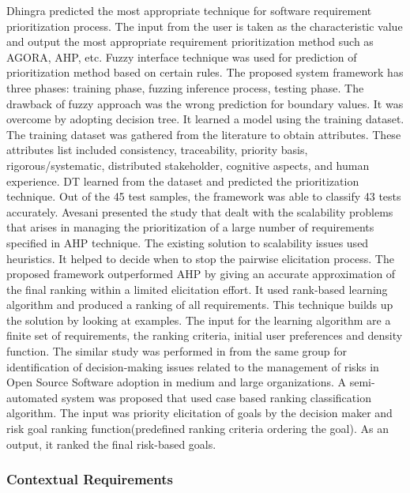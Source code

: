 Dhingra \etal  \cite{S.Dhingra} predicted the most appropriate technique for
software requirement prioritization process. The input from the user is taken as
the characteristic value and output the
most appropriate requirement prioritization method such as AGORA, AHP, etc. Fuzzy interface technique was
used for prediction of prioritization method based on certain rules. The
proposed system framework has three phases: training phase, fuzzing inference
process, testing phase. The drawback of fuzzy approach was the wrong prediction
for boundary values. It was overcome by adopting decision tree. It learned a
model using the training dataset. The training dataset was gathered from the
literature to obtain attributes. These attributes list included consistency,
traceability, priority basis, rigorous/systematic, distributed stakeholder,
cognitive aspects, and human experience.  DT learned from the dataset and
predicted the prioritization technique. Out of the 45 test samples, the
framework was able to classify 43 tests accurately. Avesani \etal
\cite{PAvesani} presented the study that dealt with the scalability problems
that arises in managing the prioritization of a large number of requirements
specified in AHP technique.  The existing solution to scalability issues used
heuristics. It helped to decide when to stop the pairwise elicitation process.
The proposed framework outperformed AHP by giving an accurate approximation of
the final ranking within a limited elicitation effort. It used rank-based
learning algorithm and produced a ranking of all requirements. This technique
builds up the solution by looking at examples. The input for the learning
algorithm are a finite set of requirements, the ranking criteria, initial user
preferences and density function.
The similar study was performed in \cite{7320432}from the same group
\cite{PAvesani} for identification of decision-making issues related to the
management of risks in Open Source Software adoption in medium and large
organizations. A  semi-automated system was proposed that used case based
ranking classification algorithm. The input was priority elicitation of goals by
the decision maker and risk goal ranking function(predefined ranking criteria
ordering the goal). As an output, it ranked the final risk-based goals.



\subsubsection{Contextual Requirements} 

